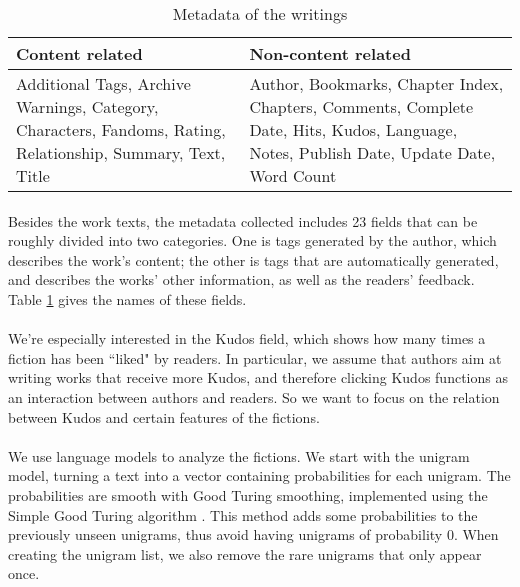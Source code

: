 \documentclass[11pt]{article} %
\begin{document}
\begin{table}[htp]
\caption{Metadata of the writings}
\begin{center}
\begin{tabular}{p{7cm}|p{7cm}}
  \hline			
 Content related & Non-content related\\\hline
Additional Tags, Archive Warnings, Category, Characters, Fandoms, Rating, Relationship, Summary, Text, Title
&  Author, Bookmarks, Chapter Index, Chapters, Comments, Complete Date, Hits, Kudos, Language, Notes, Publish Date, Update Date, Word Count\\
\hline
\end{tabular}
\end{center}
\label{tab:metadata}
\end{table}%

\paragraph{} Besides the work texts, the metadata collected includes 23 fields that can be roughly divided into two categories. One is tags generated by the author, which describes the work’s content; the other is tags that are automatically generated, and describes the works’ other information, as well as the readers' feedback. Table \ref{tab:metadata} gives the names of these fields. 

\paragraph{} We're especially interested in the Kudos field, which shows how many times a fiction has been ``liked" by readers. In particular, we assume that authors aim at writing works that receive more Kudos, and therefore clicking Kudos functions as an interaction between authors and readers. So we want to focus on the relation between Kudos and certain features of the fictions.

\paragraph{} We use language models to analyze the fictions. We start with the unigram model, turning a text into a vector containing probabilities for each unigram. The probabilities are smooth with Good Turing smoothing, implemented using the Simple Good Turing algorithm \cite{gales1995good}. This method adds some probabilities to the previously unseen unigrams, thus avoid having unigrams of probability 0. When creating the unigram list, we also remove the rare unigrams that only appear once.
\end{document}
